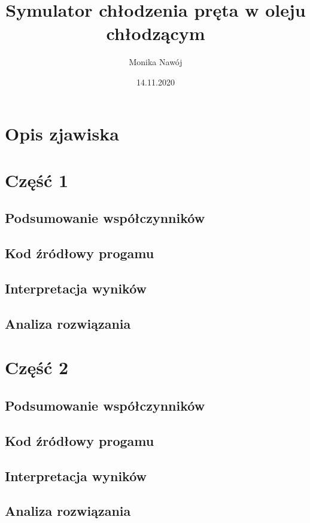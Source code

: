 \documentclass[
	12pt, %
]{fphw}
\title{Symulator chłodzenia pręta w oleju chłodzącym} %
\author{Monika Nawój} %
\date{14.11.2020} %
\institute{Politechnika Warszawska \\ Wydział Elektryczny} %
\begin{document}
\maketitle %


\section{Opis zjawiska}
\section{Część 1}
\subsection{Podsumowanie współczynników}
\subsection{Kod źródłowy progamu}
\subsection{Interpretacja wyników}
\subsection{Analiza rozwiązania}
\section{Część 2}
\subsection{Podsumowanie współczynników}
\subsection{Kod źródłowy progamu}
\subsection{Interpretacja wyników}
\subsection{Analiza rozwiązania}
\end{document}

